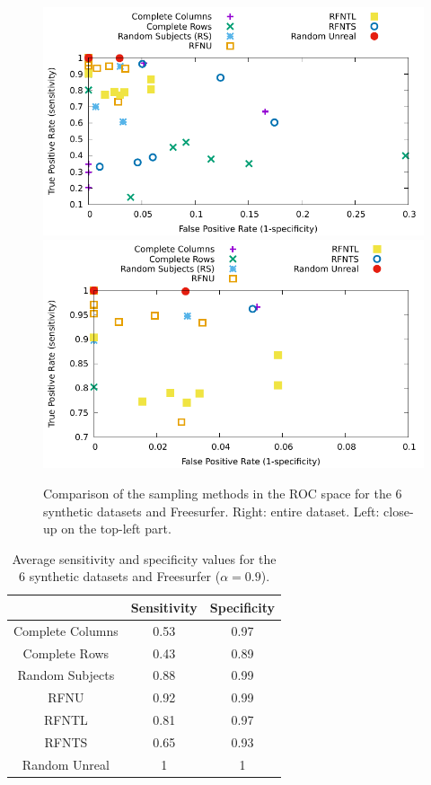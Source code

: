 \documentclass[10pt, conference, compsocconf]{IEEEtran}
\begin{document}
\begin{figure}
\includegraphics[width=\columnwidth]{data/results/roc/roc.pdf}
\includegraphics[width=\columnwidth]{data/results/roc/roc-closeup.pdf}
\caption{Comparison of the sampling methods in the ROC space for the 6 synthetic datasets and Freesurfer. Right: entire dataset. Left: close-up on the top-left part.}
\label{fig:roc}
\end{figure}

\begin{table}
\centering
\begin{tabular}{ccc}
& Sensitivity & Specificity \\
\hline
Complete Columns & 0.53 & 0.97\\
Complete Rows & 0.43 & 0.89\\
Random Subjects & 0.88 & 0.99\\
RFNU & 0.92 & 0.99 \\
RFNTL & 0.81 & 0.97\\
RFNTS & 0.65 & 0.93 \\
Random Unreal & 1 & 1
\end{tabular}
\caption{Average sensitivity and specificity values for the 6 synthetic datasets and Freesurfer ($\alpha=0.9$).}
\label{table:roc}
\end{table}
\end{document}
